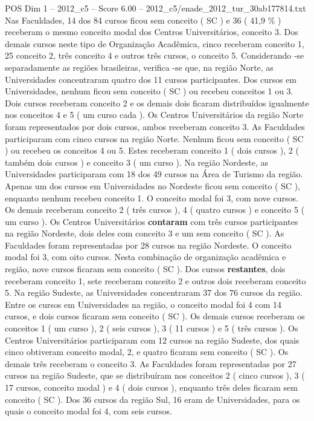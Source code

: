 \begin{textsample}{POS Dim 1 – 2012\_c5 – Score 6.00 – 2012\_c5/enade\_2012\_tur\_30ab177814.txt}
Nas Faculdades, 14 dos 84 cursos ficou sem conceito ( SC ) e 36 ( 41,9 \% ) receberam o mesmo conceito modal dos Centros Universitários, conceito 3.
Dos demais cursos neste tipo de Organização Acadêmica, cinco receberam conceito 1, 25 conceito 2, três conceito 4 e outros três cursos, o conceito 5.
Considerando -se separadamente as regiões brasileiras, verifica -se que, na região Norte, as Universidades concentraram quatro dos 11 cursos participantes.
Dos cursos em Universidades, nenhum ficou sem conceito ( SC ) ou recebeu conceitos 1 ou 3.
Dois cursos receberam conceito 2 e os demais dois ficaram distribuídos igualmente nos conceitos 4 e 5 ( um curso cada ).
Os Centros Universitários da região Norte foram representados por dois cursos, ambos receberam conceito 3.
As Faculdades participaram com cinco cursos na região Norte.
Nenhum ficou sem conceito ( SC ) ou recebeu os conceitos 4 ou 5.
Estes receberam conceito 1 ( dois cursos ), 2 ( também dois cursos ) e conceito 3 ( um curso ).
Na região Nordeste, as Universidades participaram com 18 dos 49 cursos na Área de Turismo da região.
Apenas um dos cursos em Universidades no Nordeste ficou sem conceito ( SC ), enquanto nenhum recebeu conceito 1.
O conceito modal foi 3, com nove cursos.
Os demais receberam conceito 2 ( três cursos ), 4 ( quatro cursos ) e conceito 5 ( um curso ).
Os Centros Universitários \textbf{contaram} com três cursos participantes na região Nordeste, dois deles com conceito 3 e um sem conceito ( SC ).
As Faculdades foram representadas por 28 cursos na região Nordeste.
O conceito modal foi 3, com oito cursos.
Nesta combinação de organização acadêmica e região, nove cursos ficaram sem conceito ( SC ).
Dos cursos \textbf{restantes}, dois receberam conceito 1, sete receberam conceito 2 e outros dois receberam conceito 5.
Na região Sudeste, as Universidades concentraram 37 dos 76 cursos da região.
Entre os cursos em Universidades na região, o conceito modal foi 4 com 14 cursos, e dois cursos ficaram sem conceito ( SC ).
Os demais cursos receberam os conceitos 1 ( um curso ), 2 ( seis cursos ), 3 ( 11 cursos ) e 5 ( três cursos ).
Os Centros Universitários participaram com 12 cursos na região Sudeste, dos quais cinco obtiveram conceito modal, 2, e quatro ficaram sem conceito ( SC ).
Os demais três receberam o conceito 3.
As Faculdades foram representadas por 27 cursos na região Sudeste, que se distribuíram nos conceitos 2 ( cinco cursos ), 3 ( 17 cursos, conceito modal ) e 4 ( dois cursos ), enquanto três deles ficaram sem conceito ( SC ).
Dos 36 cursos da região Sul, 16 eram de Universidades, para os quais o conceito modal foi 4, com seis cursos.

\end{textsample}
